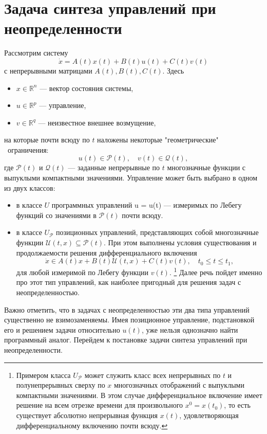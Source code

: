 \section{Задача синтеза управлений при неопределенности}

Рассмотрим систему
\begin{equation}\label{problem}
    \dot{x} = A(t)x(t) + B(t)u(t) + C(t)v(t)
\end{equation}
с непрерывными матрицами \( A(t), B(t), C(t) \). 
Здесь 
\begin{itemize}
    \item \( x \in \mathbb{R}^n \) --- вектор состояния системы, 
    \item \( u \in \mathbb{R}^p \) --- управление, 
    \item \( v \in \mathbb{R}^q \) --- неизвестное внешнее возмущение,
\end{itemize}
на которые почти всюду по \( t \) наложены некоторые "геометрические"  \ 
 ограничения:
\begin{equation}\label{problem_bounds}
    u(t) \in \mathcal{P}(t), \quad v(t) \in \mathcal{Q}(t),
\end{equation}
 где \( \mathcal{P}(t) \) и \( \mathcal{Q}(t) \) --- заданные непрерывные по \( t \) 
 многозначные функции с выпуклыми компактными значениями. 
Управление может быть выбрано в одном из двух классов:
\begin{itemize}
    \item в классе \( U \) программных управлений u = u(t) --- измеримых по
     Лебегу функций со значениями в \( \mathcal{P}(t) \) почти всюду.
    \item в классе \( U_\mathcal{P} \) позиционных управлений, представляющих
     собой многозначные функции \( \mathcal{U}(t,x) \subseteq
     \mathcal{P}(t) \). При этом выполнены условия существования и
     продолжаемости решения дифференциального включения
    \begin{equation}\label{dif_inclusion}
        \dot{x} \in A(t)x + B(t)\mathcal{U}(t,x) + C(t)v(t), \quad
         t_0 \le t \le t_1, 
    \end{equation}
    для любой измеримой по Лебегу функции \( v(t) \). \footnote{Примером класса
     \( U_\mathcal{P} \) может служить класс всех непрерывных по \( t \) и
     полунепрерывных сверху по \( x \) многозначных отображений с выпуклыми
     компактными значениями. В этом случае дифференциальное включение имеет
     решение на всем отрезке времени для произвольного \( x^0 = x(t_0) \),
     то есть существует абсолютно непрерывная функция \( x(t) \),
     удовлетворяющая дифференциальному включению почти всюду.} Далее речь пойдет
     именно про этот тип управлений, как наиболее пригодный для решения задач с 
     неопределенностью.
\end{itemize}
Важно отметить, что в задачах с неопределенностью эти два типа управлений
 существенно не взимозаменяемы. Имея позиционное управление, подстановкой его
 и решением задачи относительно \( u(t) \), уже нельзя однозначно найти
 программный аналог. Перейдем к постановке задачи синтеза управлений при 
 неопределенности.

